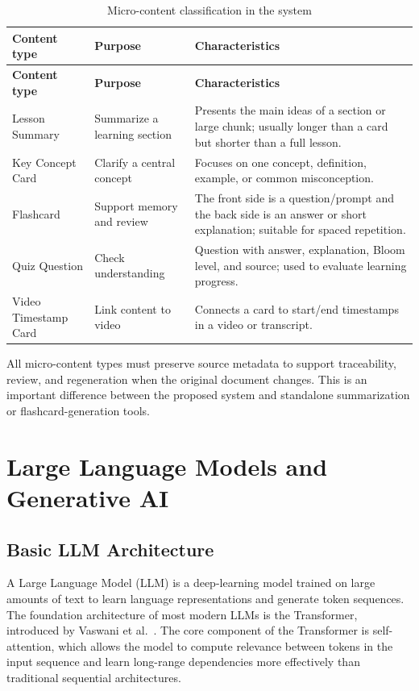 \begin{longtable}{|p{3cm}|p{4.2cm}|p{6.8cm}|}
\caption{Micro-content classification in the system}
\label{tab:micro-content-types}\\
\hline
\textbf{Content type} & \textbf{Purpose} & \textbf{Characteristics} \\
\hline
\endfirsthead
\hline
\textbf{Content type} & \textbf{Purpose} & \textbf{Characteristics} \\
\hline
\endhead
Lesson Summary & Summarize a learning section & Presents the main ideas of a section or large chunk; usually longer than a card but shorter than a full lesson. \\
\hline
Key Concept Card & Clarify a central concept & Focuses on one concept, definition, example, or common misconception. \\
\hline
Flashcard & Support memory and review & The front side is a question/prompt and the back side is an answer or short explanation; suitable for spaced repetition. \\
\hline
Quiz Question & Check understanding & Question with answer, explanation, Bloom level, and source; used to evaluate learning progress. \\
\hline
Video Timestamp Card & Link content to video & Connects a card to start/end timestamps in a video or transcript. \\
\hline
\end{longtable}

All micro-content types must preserve source metadata to support
traceability, review, and regeneration when the original document changes.
This is an important difference between the proposed system and standalone
summarization or flashcard-generation tools.

\section{Large Language Models and Generative AI}
\label{sec:llm-generative-ai}

\subsection{Basic LLM Architecture}
\label{subsec:kien-truc-llm}

A Large Language Model (LLM) is a deep-learning model trained on large
amounts of text to learn language representations and generate token
sequences. The foundation architecture of most modern LLMs is the
Transformer, introduced by Vaswani et al.~\cite{vaswani2017attention}.
The core component of the Transformer is self-attention, which allows the
model to compute relevance between tokens in the input sequence and learn
long-range dependencies more effectively than traditional sequential
architectures.

